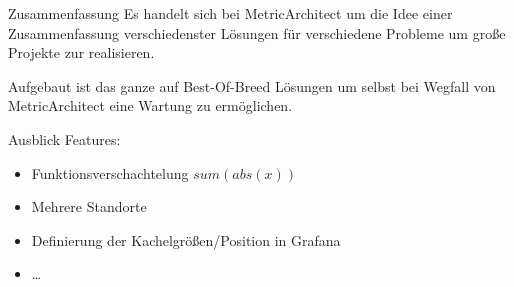 \documentclass[12pt, pdf, xcolor={table, dvipsnames}, paperheight=8cm,paperwidth=12cm]{beamer}
\begin{document}
\begin{frame}{Zusammenfassung}
	Es handelt sich bei MetricArchitect um die Idee einer Zusammenfassung verschiedenster Lösungen für verschiedene Probleme um große Projekte zur realisieren.
	 
	\vspace{1em}
	Aufgebaut ist das ganze auf Best-Of-Breed Lösungen um selbst bei Wegfall von MetricArchitect eine Wartung zu ermöglichen.
	\begin{center}
	\end{center}
\end{frame}

\begin{frame}{Ausblick}
	Features:
	\begin{itemize}
		\item Funktionsverschachtelung $sum(abs(x))$
		\item Mehrere Standorte
		\item Definierung der Kachelgrößen/Position in Grafana
		\item \dots
	\end{itemize}
\end{frame}



\end{document}
